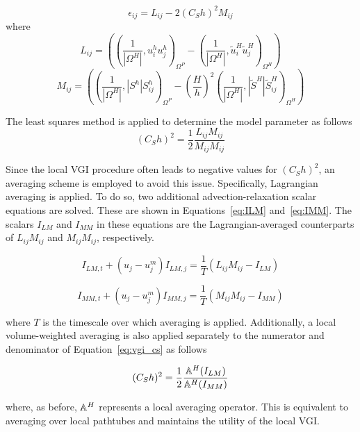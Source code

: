 \begin{equation}
\label{eq:vgilres}
\epsilon_{ij} = L_{ij} - 2 (C_S h)^2 M_{ij}
\end{equation}
\noindent where
\begin{equation}
\label{eq:lij}
L_{ij} = \left(\left(\frac{1}{|\Omega^H|}, u^h_i u^h_j\right)_{\Omega^P} - \left(\frac{1}{|\Omega^H|}, \widetilde{u}^H_i \widetilde{u}^H_j\right)_{\Omega^H} \right)
\end{equation}
\begin{equation}
\label{eq:mij}
M_{ij} = \left(\left(\frac{1}{|\Omega^H|}, |S^h| S^h_{ij}\right)_{\Omega^P} - \left(\frac{H}{h}\right)^2\left(\frac{1}{|\Omega^H|}, |\widetilde{S}^H| \widetilde{S}^H_{ij}\right)_{\Omega^H} \right)
\end{equation}

The least squares method is applied to determine the model parameter as follows
\begin{equation}
\label{eq:vgi_cs}
(C_S h)^2 = \frac{1}{2}\frac{L_{ij}M_{ij}}{M_{ij}M_{ij}}
\end{equation}

Since the local VGI procedure often leads to negative values
for $(C_S h)^2$, an averaging scheme is employed to avoid this issue.
Specifically, Lagrangian averaging 
is applied\cite{bib:meneveau96}.
To do so, two additional advection-relaxation scalar equations are solved.
These are shown in Equations~\eqref{eq:ILM} and~\eqref{eq:IMM}.
The scalars $I_{LM}$ and $I_{MM}$ in these equations are the
Lagrangian-averaged counterparts of
$L_{ij} M_{ij}$ and $M_{ij} M_{ij}$, respectively.

\begin{equation}
\label{eq:ILM}
  I_{LM,t} + (u_j - u^m_j) I_{LM,j} = \frac{1}{T} (L_{ij}M_{ij} - I_{LM})
\end{equation}

\begin{equation}
\label{eq:IMM}
  I_{MM,t}+ (u_j - u^m_j) I_{MM,j} = \frac{1}{T} (M_{ij}M_{ij} - I_{MM})
\end{equation}

\noindent where $T$ is the timescale over which averaging is applied.
Additionally, a local volume-weighted averaging
is also applied separately to the numerator and denominator
of Equation~\eqref{eq:vgi_cs} as follows

\begin{equation}
\label{eq:CS_LDS}
  (C_S h)^2 = \frac{1}{2}\frac{\mathbb{A}^{H}(I_{LM})}{\mathbb{A}^{H}(I_{MM})}
\end{equation}

\noindent where, as before, $\mathbb{A}^{H}$ represents a local averaging operator.
This is equivalent to averaging over local pathtubes\cite{bib:tran2016,bib:tran2017b} and maintains the utility of the local VGI.

